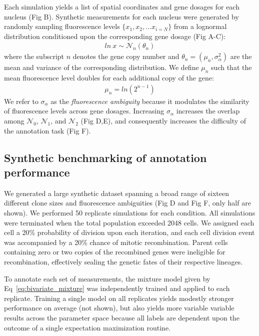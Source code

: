 \documentclass[10pt,letterpaper]{article}
\begin{document}
Each simulation yields a list of spatial coordinates and gene dosages for each nucleus (Fig B). Synthetic measurements for each nucleus were generated by randomly sampling fluorescence levels $\{x_1, x_2, \ldots x_{i=N} \}$ from a lognormal distribution conditioned upon the corresponding gene dosage (Fig A-C):
\begin{eqnarray}
ln\ x \sim \mathcal{N}_n(\theta _n)
\end{eqnarray}
where the subscript $n$ denotes the gene copy number and $\theta_n = (\mu_n,\sigma_{\alpha}^2)$ are the mean and variance of the corresponding distribution. We define $\mu_n$ such that the mean fluorescence level doubles for each additional copy of the gene:
\begin{eqnarray}
\mu_{n } = ln(2^{n-1})
\end{eqnarray}
We refer to $\sigma_{\alpha}$ as the \emph{fluorescence ambiguity} because it modulates the similarity of fluorescence levels across gene dosages. Increasing $\sigma_{\alpha}$ increases the overlap among $\mathcal{N}_0$, $\mathcal{N}_1$, and $\mathcal{N}_2$ (Fig D,E), and consequently increases the difficulty of the annotation task (Fig F).

\subsection*{Synthetic benchmarking of annotation performance}

We generated a large synthetic dataset spanning a broad range of sixteen different clone sizes and fluorescence ambiguities (Fig D and Fig F, only half are shown). We performed 50 replicate simulations for each condition. All simulations were terminated when the total population exceeded 2048 cells. We assigned each cell a 20\% probability of division upon each iteration, and each cell division event was accompanied by a 20\% chance of mitotic recombination. Parent cells containing zero or two copies of the recombined genes were ineligible for recombination, effectively sealing the genetic fates of their respective lineages. 

To annotate each set of measurements, the mixture model given by Eq~\ref{eq:bivariate_mixture} was independently trained and applied to each replicate. Training a single model on all replicates yields modestly stronger performance on average (not shown), but also yields more variable variable results across the parameter space because all labels are dependent upon the outcome of a single expectation maximization routine. 
\end{document}
